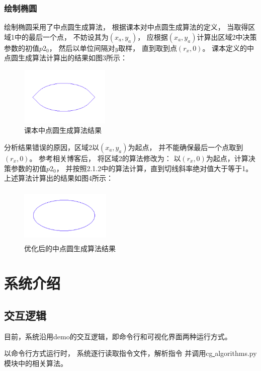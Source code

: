 \documentclass[a4paper,UTF8]{article}
\theoremstyle{definition}
\begin{document}
\subsubsection{绘制椭圆}
绘制椭圆采用了中点圆生成算法，
根据课本对中点圆生成算法的定义，
当取得区域1中的最后一个点，
不妨设其为$(x_a,y_a)$，
应根据$(x_a,y_a)$计算出区域2中决策参数的初值$p2_0$，
然后以单位间隔对$y$取样，
直到取到点$(r_x,0)$。
课本定义的中点圆生成算法计算出的结果如图3所示：

\begin{figure}[H]
    \centering
    \includegraphics[width=4.3cm,height=2.8cm]{3.png}
    \caption{课本中点圆生成算法结果}
\end{figure}

分析结果错误的原因，区域2以$(x_a,y_a)$为起点，
并不能确保最后一个点取到$(r_x,0)$。
参考相关博客\cite{ref2}后，
将区域2的算法修改为：
以$(r_x,0)$为起点，计算决策参数的初值$p2_0$，
并按照2.1.2中的算法计算，直到切线斜率绝对值大于等于1。
上述算法计算出的结果如图4所示：

\begin{figure}[H]
    \centering
    \includegraphics[width=4.3cm,height=2.7cm]{4.png}
    \caption{优化后的中点圆生成算法结果}
\end{figure}



\section{系统介绍}
\subsection{交互逻辑}
目前，系统沿用demo的交互逻辑，即命令行和可视化界面两种运行方式。

以命令行方式运行时，
系统逐行读取指令文件，解析指令
并调用cg\underline{ }algorithms.py模块中的相关算法。
\end{document}
